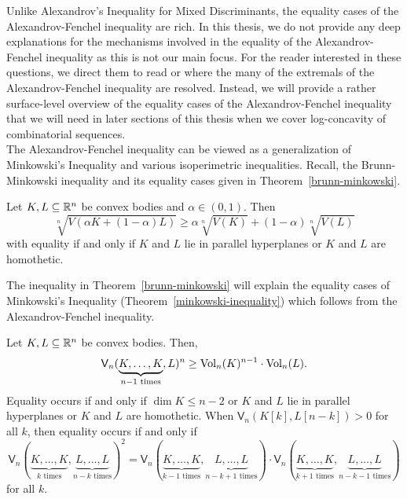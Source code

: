 \documentclass{puthesis-UG}
\begin{document}
Unlike Alexandrov's Inequality for Mixed Discriminants, the equality cases of the Alexandrov-Fenchel inequality are rich. In this thesis, we do not provide any deep explanations for the mechanisms involved in the equality of the Alexandrov-Fenchel inequality as this is not our main focus. For the reader interested in these questions, we direct them to read \cite{minkowski-quadratic-inequality} or \cite{shenfeld2022extremals} where the many of the extremals of the Alexandrov-Fenchel inequality are resolved. Instead, we will provide a rather surface-level overview of the equality cases of the Alexandrov-Fenchel inequality that we will need in later sections of this thesis when we cover log-concavity of combinatorial sequences. \\

The Alexandrov-Fenchel inequality can be viewed as a generalization of Minkowski's Inequality and various isoperimetric inequalities. Recall, the Brunn-Minkowski inequality and its equality cases given in Theorem~\ref{brunn-minkowski}.
\begin{thm} \label{brunn-minkowski}
	Let $K, L \subseteq \mathbb{R}^n$ be convex bodies and $\alpha \in (0, 1)$. Then
	\[
		\sqrt[n]{V(\alpha K + (1-\alpha) L)} \geq \alpha \sqrt[n]{V(K)} + (1-\alpha) \sqrt[n]{V(L)}
	\]
	with equality if and only if $K$ and $L$ lie in parallel hyperplanes or $K$ and $L$ are homothetic. 
\end{thm}

The inequality in Theorem~\ref{brunn-minkowski} will explain the equality cases of Minkowski's Inequality (Theorem~\ref{minkowski-inequality}) which follows from the Alexandrov-Fenchel inequality.

\begin{thm} \label{minkowski-inequality}
	Let $K, L \subseteq \mathbb{R}^n$ be convex bodies. Then, 
	\[
		\mathsf{V}_n(\underbrace{K, \ldots, K}_{n-1 \text{ times}}, L)^n \geq \operatorname{Vol}_n(K)^{n-1} \cdot \operatorname{Vol}_n(L).
	\]
	Equality occurs if and only if $\dim K \leq n-2$ or $K$ and $L$ lie in parallel hyperplanes or $K$ and $L$ are homothetic. When $\mathsf{V}_n(K[k], L[n-k]) > 0$ for all $k$, then equality occurs if and only if 
	\[
		\mathsf{V}_n(\underbrace{K, \ldots, K}_{k \text{ times}}, \underbrace{L, \ldots, L}_{n-k \text{ times}})^2 = \mathsf{V}_n(\underbrace{K, \ldots, K}_{k-1 \text{ times}}, \underbrace{L, \ldots, L}_{n-k+1 \text{ times}}) \cdot \mathsf{V}_n(\underbrace{K, \ldots, K}_{k+1 \text{ times}}, \underbrace{L, \ldots, L}_{n-k-1 \text{ times}})
	\]
	for all $k$. 
\end{thm}
\end{document}
